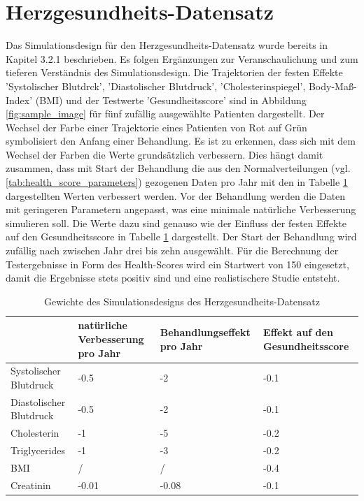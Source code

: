 \documentclass[%
thesis=student,%
coverpage=false,%
titlepage=false,%
headmarks=true, %
german,%
font=libertine, %
math=newpxtx, %
BCOR=5mm,%
coverBCOR=11mm%
]{tumbook}
\theoremstyle{break}
\begin{document}
\section{Herzgesundheits-Datensatz}
Das Simulationsdesign für den Herzgesundheits-Datensatz wurde bereits in Kapitel 3.2.1 beschrieben. Es folgen Ergänzungen zur Veranschaulichung und zum tieferen Verständnis des Simulationsdesign. Die Trajektorien der festen Effekte 'Systolischer Blutdrck', 'Diastolischer Blutdruck', 'Cholesterinspiegel', Body-Maß-Index' (BMI) und der Testwerte 'Gesundheitsscore' sind in Abbildung \ref{fig:sample_image} für fünf zufällig ausgewählte Patienten dargestellt. Der Wechsel der Farbe einer Trajektorie eines Patienten von Rot auf Grün symbolisiert den Anfang einer Behandlung. Es ist zu erkennen, dass sich mit dem Wechsel der Farben die Werte grundsätzlich verbessern. Dies hängt damit zusammen, dass mit Start der Behandlung die aus den Normalverteilungen (vgl. \ref{tab:health_score_parameters}) gezogenen Daten pro Jahr mit den in Tabelle \ref{tab:weights} dargestellten Werten verbessert werden. Vor der Behandlung werden die Daten mit geringeren Parametern angepasst, was eine minimale natürliche Verbesserung simulieren soll. Die Werte dazu sind genauso wie der Einfluss der festen Effekte auf den Gesundheitsscore in Tabelle \ref{tab:weights} dargestellt. Der Start der Behandlung wird zufällig nach zwischen Jahr drei bis zehn ausgewählt. Für die Berechnung der Testergebnisse in Form des Health-Scores wird ein Startwert von 150 eingesetzt, damit die Ergebnisse stets positiv sind und eine realistischere Studie entsteht. 
\begin{table}[H]
	\centering
	\begin{tabular}{|p{3cm}|p{3cm}|p{3cm}|p{3cm}|}
		\hline
		&  natürliche Verbesserung pro Jahr &  Behandlungseffekt pro Jahr &  Effekt auf den Gesundheitsscore \\
		\hline
		Systolischer Blutdruck & -0.5 &  -2 &  -0.1 \\
		\hline
		Diastolischer Blutdruck &  -0.5 &  -2 &  -0.1 \\
		\hline
		Cholesterin &  -1 &  -5 &  -0.2 \\
		\hline
		Triglycerides &  -1 &  -3 &  -0.2 \\
		\hline
		BMI &  / &  / &  -0.4 \\
		\hline
		Creatinin &  -0.01 &  -0.08 &  -0.1 \\
		\hline
	\end{tabular}
	\caption{Gewichte des Simulationsdesigns des Herzgesundheits-Datensatz}
	\label{tab:weights}
\end{table}
\end{document}
